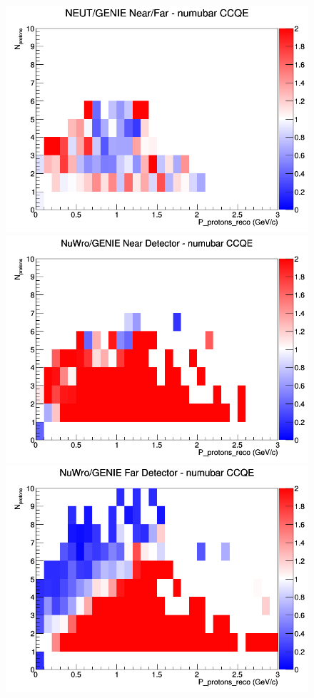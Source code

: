 \documentclass[12pt]{article}
\begin{document}
\begin{figure}[h]
\endminipage
{}
\includegraphics[width=\linewidth]{eff_N_P/FGT/protons/ratios/CCQE_NEUT_GENIE_numubar_NF_N_P.png}
\endminipage
\newline
{}
\includegraphics[width=\linewidth]{eff_N_P/FGT/protons/ratios/CCQE_NuWro_GENIE_numubar_near_N_P.png}
\endminipage
{}
\includegraphics[width=\linewidth]{eff_N_P/FGT/protons/ratios/CCQE_NuWro_GENIE_numubar_far_N_P.png}

\end{figure}
\end{document}
